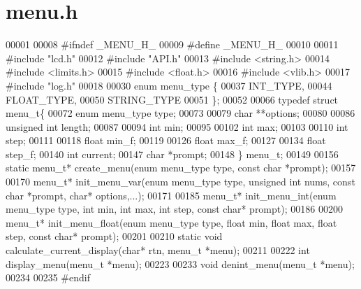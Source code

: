 \section{menu.\+h}
\label{menu_8h_source}

\begin{DoxyCode}
00001 
00008 \textcolor{preprocessor}{#ifndef \_MENU\_H\_}
00009 \textcolor{preprocessor}{#define \_MENU\_H\_}
00010 
00011 \textcolor{preprocessor}{#include "lcd.h"}
00012 \textcolor{preprocessor}{#include "API.h"}
00013 \textcolor{preprocessor}{#include <string.h>}
00014 \textcolor{preprocessor}{#include <limits.h>}
00015 \textcolor{preprocessor}{#include <float.h>}
00016 \textcolor{preprocessor}{#include <vlib.h>}
00017 \textcolor{preprocessor}{#include "log.h"}
00018 
00030 \textcolor{keyword}{enum} menu_type \{
00037   INT_TYPE,
00044   FLOAT_TYPE,
00050   STRING_TYPE
00051 \};
00052 
00066 \textcolor{keyword}{typedef} \textcolor{keyword}{struct }menu_t\{
00072   \textcolor{keyword}{enum} menu_type type;
00073 
00079   \textcolor{keywordtype}{char} **options;
00080 
00086   \textcolor{keywordtype}{unsigned} \textcolor{keywordtype}{int} length;
00087 
00094   \textcolor{keywordtype}{int} min;
00095 
00102   \textcolor{keywordtype}{int} max;
00103 
00110   \textcolor{keywordtype}{int} step;
00111 
00118   \textcolor{keywordtype}{float} min_f;
00119 
00126   \textcolor{keywordtype}{float} max_f;
00127 
00134   \textcolor{keywordtype}{float} step_f;
00140   \textcolor{keywordtype}{int} current;
00147   \textcolor{keywordtype}{char} *prompt;
00148 \} menu_t;
00149 
00156 \textcolor{keyword}{static} menu_t* create_menu(\textcolor{keyword}{enum} menu_type type, \textcolor{keyword}{const} \textcolor{keywordtype}{char} *prompt);
00157 
00170 menu_t* init_menu_var(\textcolor{keyword}{enum} menu_type type, \textcolor{keywordtype}{unsigned} \textcolor{keywordtype}{int} nums, \textcolor{keyword}{const} \textcolor{keywordtype}{char} *prompt, \textcolor{keywordtype}{char}* 
      options,...);
00171 
00185 menu_t* init_menu_int(\textcolor{keyword}{enum} menu_type type, \textcolor{keywordtype}{int} min, \textcolor{keywordtype}{int} max, \textcolor{keywordtype}{int} step, \textcolor{keyword}{const} \textcolor{keywordtype}{char}* 
      prompt);
00186 
00200 menu_t* init_menu_float(\textcolor{keyword}{enum} menu_type type, \textcolor{keywordtype}{float} min, \textcolor{keywordtype}{float} max, \textcolor{keywordtype}{float} step, \textcolor{keyword}{const} \textcolor{keywordtype}{char}* 
      prompt);
00201 
00210 \textcolor{keyword}{static} \textcolor{keywordtype}{void} calculate_current_display(\textcolor{keywordtype}{char}* rtn, menu_t *menu);
00211 
00222 \textcolor{keywordtype}{int} display_menu(menu_t *menu);
00223 
00233 \textcolor{keywordtype}{void} denint_menu(menu_t *menu);
00234 
00235 \textcolor{preprocessor}{#endif}
\end{DoxyCode}
